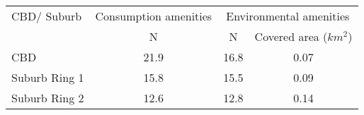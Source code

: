 \begin{table}[htbp]
	\centering
	\begin{tabular}{lccc}
		\hline\hline
		CBD/ Suburb & Consumption amenities & \multicolumn{2}{c}{Environmental amenities} \\ 
		& N & N & Covered area ($km^{2}$) \\\cmidrule(r{2pt}){2-2}\cmidrule(r{2pt}){3-4}
		CBD & 21.9 & 16.8 & 0.07\\
		Suburb Ring 1 & 15.8 & 15.5 & 0.09\\
		Suburb Ring 2 & 12.6 & 12.8 & 0.14\\  
		\hline\hline
	\end{tabular}
\end{table}